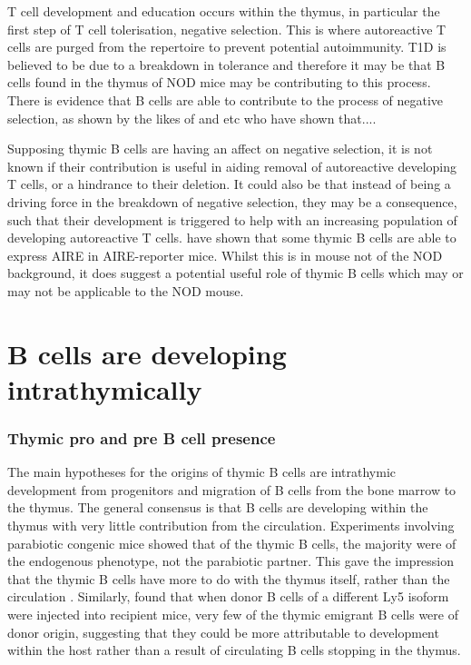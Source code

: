 T cell development and education occurs within the thymus, in particular the first step of T cell tolerisation, negative selection.
This is where autoreactive T cells are purged from the repertoire to prevent potential autoimmunity.
T1D is believed to be due to a breakdown in tolerance and therefore it may be that B cells found in the thymus of NOD mice may be contributing to this process.
There is evidence that B cells are able to contribute to the process of negative selection, as shown by the likes of \toref{} and \toref{} etc who have shown that.... 

Supposing thymic B cells are having an affect on negative selection, it is not known if their contribution is useful in aiding removal of autoreactive developing T cells, or a hindrance to their deletion.
It could also be that instead of being a driving force in the breakdown of negative selection, they may be a consequence, such that their development is triggered to help with an increasing population of developing autoreactive T cells.
\citet{Yamano2015} have shown that some thymic B cells are able to express AIRE in AIRE-reporter mice. 
Whilst this is in mouse not of the NOD background, it does suggest a potential useful role of thymic B cells which may or may not be applicable to the NOD mouse.

\section{B cells are developing intrathymically}

\subsubsection{Thymic pro and pre B cell presence}
The main hypotheses for the origins of thymic B cells are intrathymic development from progenitors and migration of B cells from the bone marrow to the thymus.
The general consensus is that B cells are developing within the thymus with very little contribution from the circulation.
Experiments involving parabiotic congenic mice showed that of the thymic B cells, the majority were of the endogenous phenotype, not the parabiotic partner. 
This gave the impression that the thymic B cells have more to do with the thymus itself, rather than the circulation \citep{Perera2013}.
Similarly, \citet{Akashi2000} found that when donor B cells of a different Ly5 isoform were injected into recipient mice, very few of the thymic emigrant B cells were of donor origin, suggesting that they could be more attributable to development within the host rather than a result of circulating B cells stopping in the thymus.


